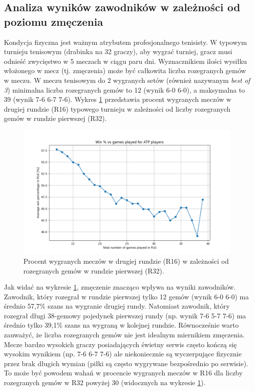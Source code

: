 \documentclass[12pt, a4paper]{article}
\begin{document}
\subsection{Analiza wyników zawodników w zależności od poziomu zmęczenia}
Kondycja fizyczna jest ważnym atrybutem profesjonalnego tenisisty. W typowym turnieju tenisowym (drabinka na 32 graczy), aby wygrać turniej, gracz musi odnieść zwycięstwo w 5 meczach w ciągu paru dni. Wyznacznikiem ilości wysiłku włożonego w mecz (tj. zmęczenia) może być całkowita liczba rozegranych gemów w meczu. W meczu tenisowym do 2 wygranych setów (również nazywanym \textit{best of 3}) minimalna liczba rozegranych gemów to 12 (wynik 6-0 6-0), a maksymalna to 39 (wynik 7-6 6-7 7-6). Wykres \ref{fig:win_games_played} przedstawia procent wygranych meczów w drugiej rundzie (R16) typowego turnieju w zależności od liczby rozegranych gemów w rundzie pierwszej (R32).
\begin{figure}[h]
    \includegraphics[width=\textwidth]{figures/win_games_played.png}
    \caption{Procent wygranych meczów w drugiej rundzie (R16) w zależności od rozegranych gemów w rundzie pierwszej (R32).}
    \label{fig:win_games_played}
\end{figure}

Jak widać na wykresie \ref{fig:win_games_played}, zmęczenie znacząco wpływa na wyniki zawodników. Zawodnik, który rozegrał w rundzie pierwszej tylko 12 gemów (wynik 6-0 6-0) ma średnio 57,7\% szans na wygranie drugiej rundy. Natomiast zawodnik, który rozegrał długi 38-gemowy pojedynek pierwszej rundy (np. wynik 7-6 5-7 7-6) ma średnio tylko 39,1\% szans na wygraną w kolejnej rundzie. Równocześnie warto zauważyć, że liczba rozegranych gemów nie jest idealnym miernikiem zmęczenia. Mecze bardzo wysokich graczy posiadających świetny serwis często kończą się wysokim wynikiem (np. 7-6 6-7 7-6) ale niekoniecznie są wyczerpujące fizycznie przez brak długich wymian (piłki są często wygrywane bezpośrednio po serwisie). To może być powodem wahań w procencie wygranych meczów w R16 dla liczby rozegranych gemów w R32 powyżej 30 (widocznych na wykresie \ref{fig:win_games_played}).
\end{document}
